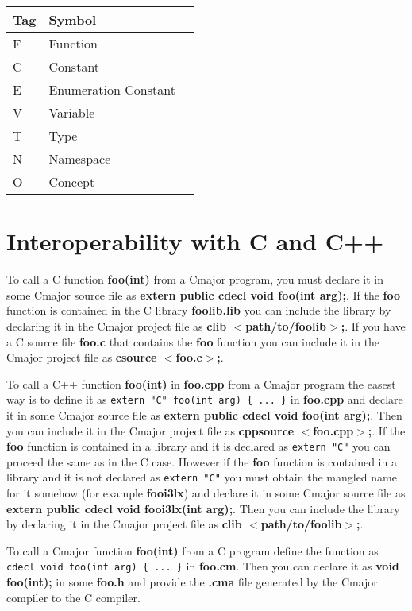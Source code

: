 \documentclass[oneside, a4paper, 11pt]{article}
\begin{document}
\begin{flushleft}
\begin{tabular}{lp{5cm}p{5cm}}
\textbf{Tag}& \textbf{Symbol}\\
\hline
F&Function\\
C&Constant\\
E&Enumeration Constant\\
V&Variable\\
T&Type\\
N&Namespace\\
O&Concept\\
\end{tabular}
\end{flushleft}

\section{Interoperability with C and C++}

To call a C function \textbf{foo(int)} from a Cmajor program, you must declare it in some Cmajor source file as
\textbf{extern public cdecl void foo(int arg);}.
If the \textbf{foo} function is contained in the C library \textbf{foolib.lib} you can
include the library by declaring it in the Cmajor project file as \textbf{clib $<$path/to/foolib$>$;}.
If you have a C source file \textbf{foo.c} that contains the \textbf{foo} function
you can include it in the Cmajor project file as \textbf{csource $<$foo.c$>$;}.

To call a C++ function \textbf{foo(int)} in \textbf{foo.cpp} from a Cmajor program the easest way is to define it
as \verb|extern "C" foo(int arg) { ... }| in \textbf{foo.cpp} and declare it in some Cmajor source file as
\textbf{extern public cdecl void foo(int arg);}. Then you can include it in the Cmajor project file as
\textbf{cppsource $<$foo.cpp$>$;}.
If the \textbf{foo} function is contained in a library and it is declared as \verb|extern "C"| you can proceed the same as in the C case.
However if the \textbf{foo} function is contained in a library and it is not declared as \verb|extern "C"| you
must obtain the mangled name for it somehow (for example \textbf{fooi3lx}) and declare it in some Cmajor source file as
\textbf{extern public cdecl void fooi3lx(int arg);}.
Then you can include the library by declaring it in the Cmajor project file as \textbf{clib $<$path/to/foolib$>$;}.

To call a Cmajor function \textbf{foo(int)} from a C program define the function as\\
\verb|cdecl void foo(int arg) { ... }| in \textbf{foo.cm}. Then you can declare it as
\textbf{void foo(int);} in some \textbf{foo.h} and
provide the \textbf{.cma} file generated by the Cmajor compiler to the C compiler.
\end{document}
